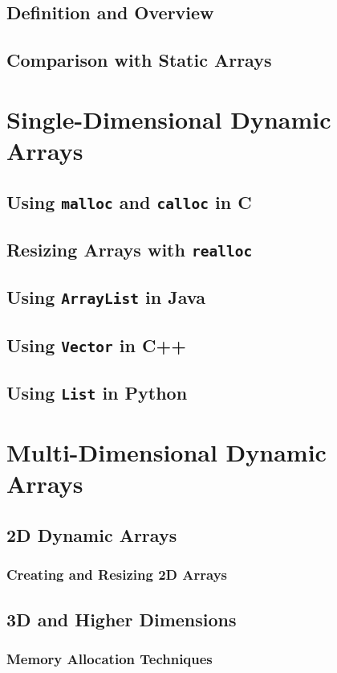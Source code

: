 \documentclass[12pt, oneside]{book}
\begin{document}
	\subsection{Definition and Overview}
	\subsection{Comparison with Static Arrays}
	
	\section{Single-Dimensional Dynamic Arrays}
	\subsection{Using \texttt{malloc} and \texttt{calloc} in C}
	\subsection{Resizing Arrays with \texttt{realloc}}
	\subsection{Using \texttt{ArrayList} in Java}
	\subsection{Using \texttt{Vector} in C++}
	\subsection{Using \texttt{List} in Python}
	
	\section{Multi-Dimensional Dynamic Arrays}
	\subsection{2D Dynamic Arrays}
	\subsubsection{Creating and Resizing 2D Arrays}
	\subsection{3D and Higher Dimensions}
	\subsubsection{Memory Allocation Techniques}
\end{document}

